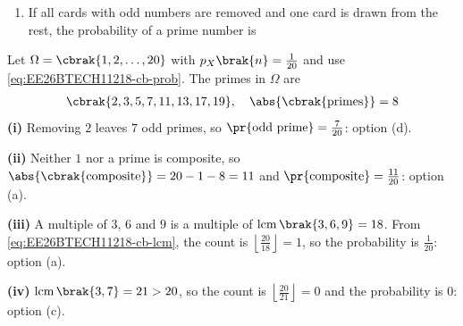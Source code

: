 \begin{enumerate}[label=\thesubsection.\arabic*, ref=\thesubsection.\theenumi,itemsep=1.5em]
\begin{enumerate}[label=(\roman*), itemsep=0pt]
\begin{enumerate}[label=\alph*), itemsep=0pt]
\end{enumerate}
\item If all cards with odd numbers are removed and one card is drawn from the rest, the probability of a prime number is
\begin{enumerate}[label=\alph*), itemsep=0pt]
\end{enumerate}
\end{enumerate}
\solution
Let $\Omega = \cbrak{1,2,\dots,20}$ with $p_X\brak{n} = \frac{1}{20}$ and use \eqref{eq:EE26BTECH11218-cb-prob}. The primes in $\Omega$ are
\begin{align}
\cbrak{2,3,5,7,11,13,17,19}, \quad \abs{\cbrak{\text{primes}}} = 8
\end{align}
\textbf{(i)} Removing $2$ leaves $7$ odd primes, so $\pr{\text{odd prime}} = \frac{7}{20}$: option (d).

\textbf{(ii)} Neither $1$ nor a prime is composite, so $\abs{\cbrak{\text{composite}}} = 20-1-8 = 11$ and $\pr{\text{composite}}=\frac{11}{20}$: option (a).

\textbf{(iii)} A multiple of $3$, $6$ and $9$ is a multiple of $\operatorname{lcm}\brak{3,6,9}=18$. From \eqref{eq:EE26BTECH11218-cb-lcm}, the count is $\left\lfloor\frac{20}{18}\right\rfloor = 1$, so the probability is $\frac{1}{20}$: option (a).

\textbf{(iv)} $\operatorname{lcm}\brak{3,7}=21>20$, so the count is $\left\lfloor\frac{20}{21}\right\rfloor = 0$ and the probability is $0$: option (c).


\end{enumerate}
